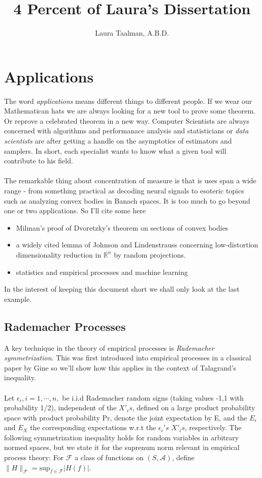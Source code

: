\documentclass{article}
\title{4 Percent of Laura's Dissertation}
\author{Laura Taalman, A.B.D.}
\theoremstyle{plain}
\begin{document}
\renewcommand{\baselinestretch}{1.5}

\maketitle

\section{Applications}
The word \textit{applications} means different things to different people. If we wear our Mathematican hats we are always looking 
for a new tool to prove some theorem. Or reprove a celebrated theorem in a new way. Computer Scientists are always concerned with algorithms and performanace analysis and statisticians or \textit{data scientists} are after getting a handle on the asymptotics of estimators and samplers. In short, each specialist wants to know what a given tool will contribute to his field. 
\paragraph{} The remarkable thing about concentration of measure is that is uses span a wide range - from something practical as decoding neural signals to esoteric topics such as analyzing convex bodies in Banach spaces. 
It is too much to go beyond one or two applications.
So I'll cite some here 
\begin{itemize}
\item  Milman's proof of Dvoretzky's theorem on sections of convex bodies
\item a widely cited lemma of Johnson and Lindenstrauss concerning low-distortion dimensionality reduction in $\mathbb{R}^{n}$ by random projections.
\item statistics and empirical processes and machine learning\cite{BBL04b}
\end{itemize}
In the interest of keeping this document short we shall only look at the last example.
\subsection{Rademacher Processes}
A key technique in the theory of empirical processes is \textit{Rademacher symmetrization}. This was first introduced into empirical processes in a classical paper by Gine \cite{Gine1984}
so we'll show how this applies in the context of Talagrand's inequality. 
\paragraph{} Let $\epsilon_i,i=1,\cdots,n,$ be i.i.d Rademacher random signs (taking values -1,1 with probability 1/2), independent of the $X'_{i}s$, defined on a large product probability space with product probability Pr, denote the joint expectation by E, and the $E_{\epsilon}$ and $E_{X}$ the corresponding expectations w.r.t the $\epsilon_i 's$ $X'_{i}s$,
respectively. The following symmetrization inequality holds for random variables in arbitrary normed spaces, but we state it for the suprenum norm relevant in empirical process theory: For $\mathcal{F}$ a class of functions on $(S,\mathcal{A})$, define $\|
H\|_{\mathcal{F}} = \mathrm{sup}_{f \in \mathcal{F}} |H(f)|$.
\end{document}
